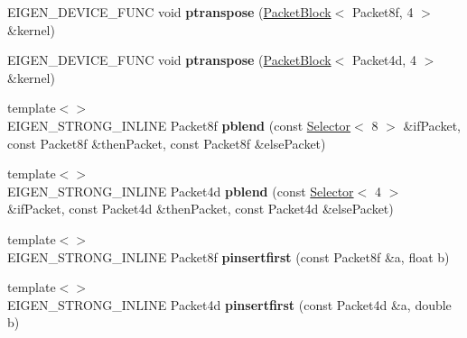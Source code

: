 \begin{DoxyCompactItemize}
\item 
\mbox{\label{namespace_eigen_1_1internal_abb168f8707e46332cd80189eff5db65e}} 
E\+I\+G\+E\+N\+\_\+\+D\+E\+V\+I\+C\+E\+\_\+\+F\+U\+NC void {\bfseries ptranspose} (\hyperlink{struct_eigen_1_1internal_1_1_packet_block}{Packet\+Block}$<$ Packet8f, 4 $>$ \&kernel)
\item 
\mbox{\label{namespace_eigen_1_1internal_a6ee455373eac923f4b973987301f7b20}} 
E\+I\+G\+E\+N\+\_\+\+D\+E\+V\+I\+C\+E\+\_\+\+F\+U\+NC void {\bfseries ptranspose} (\hyperlink{struct_eigen_1_1internal_1_1_packet_block}{Packet\+Block}$<$ Packet4d, 4 $>$ \&kernel)
\item 
\mbox{\label{namespace_eigen_1_1internal_a0419f98a9afb39a824151324d0b86ba4}} 
{\footnotesize template$<$$>$ }\\E\+I\+G\+E\+N\+\_\+\+S\+T\+R\+O\+N\+G\+\_\+\+I\+N\+L\+I\+NE Packet8f {\bfseries pblend} (const \hyperlink{struct_eigen_1_1internal_1_1_selector}{Selector}$<$ 8 $>$ \&if\+Packet, const Packet8f \&then\+Packet, const Packet8f \&else\+Packet)
\item 
\mbox{\label{namespace_eigen_1_1internal_ad58c56d83790762a9674682f330498af}} 
{\footnotesize template$<$$>$ }\\E\+I\+G\+E\+N\+\_\+\+S\+T\+R\+O\+N\+G\+\_\+\+I\+N\+L\+I\+NE Packet4d {\bfseries pblend} (const \hyperlink{struct_eigen_1_1internal_1_1_selector}{Selector}$<$ 4 $>$ \&if\+Packet, const Packet4d \&then\+Packet, const Packet4d \&else\+Packet)
\item 
\mbox{\label{namespace_eigen_1_1internal_a10dcda242af14e8a56d3ba1163d1d2e6}} 
{\footnotesize template$<$$>$ }\\E\+I\+G\+E\+N\+\_\+\+S\+T\+R\+O\+N\+G\+\_\+\+I\+N\+L\+I\+NE Packet8f {\bfseries pinsertfirst} (const Packet8f \&a, float b)
\item 
\mbox{\label{namespace_eigen_1_1internal_a1c3862e87d930ec6efc2c9dd4cef3a2b}} 
{\footnotesize template$<$$>$ }\\E\+I\+G\+E\+N\+\_\+\+S\+T\+R\+O\+N\+G\+\_\+\+I\+N\+L\+I\+NE Packet4d {\bfseries pinsertfirst} (const Packet4d \&a, double b)
\item 

\end{DoxyCompactItemize}

